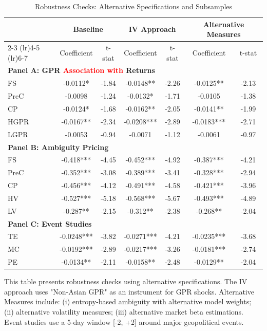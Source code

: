 \documentclass[preprint,12pt,authoryear]{elsarticle}
\begin{document}
\begin{table}[htbp]
\centering
\caption{Robustness Checks: Alternative Specifications and Subsamples}
\label{tab:robustness}
\begin{threeparttable}
\begin{tabular*}{\textwidth}{@{\extracolsep{\fill}} lcccccc @{\extracolsep{\fill}}}
\toprule
& \multicolumn{2}{c}{Baseline} & \multicolumn{2}{c}{IV Approach} & \multicolumn{2}{c}{Alternative Measures} \\
\cmidrule(lr){2-3} \cmidrule(lr){4-5} \cmidrule(lr){6-7}
& Coefficient & t-stat & Coefficient & t-stat & Coefficient & t-stat \\
\midrule
\midrule
\multicolumn{7}{l}{\textbf{Panel A: GPR \textcolor{red}{Association with} Returns}} \\
FS & -0.0112* & -1.84 & -0.0148** & -2.26 & -0.0125** & -2.13 \\
PreC & -0.0098 & -1.24 & -0.0132* & -1.71 & -0.0105 & -1.38 \\
CP & -0.0124* & -1.68 & -0.0162** & -2.05 & -0.0141** & -1.99 \\
HGPR & -0.0167** & -2.34 & -0.0208*** & -2.89 & -0.0183*** & -2.71 \\
LGPR & -0.0053 & -0.94 & -0.0071 & -1.12 & -0.0061 & -0.97 \\
\midrule
\multicolumn{7}{l}{\textbf{Panel B: Ambiguity Pricing}} \\
FS & -0.418*** & -4.45 & -0.452*** & -4.92 & -0.387*** & -4.21 \\
PreC & -0.352*** & -3.08 & -0.389*** & -3.41 & -0.328*** & -2.94 \\
CP & -0.456*** & -4.12 & -0.491*** & -4.58 & -0.421*** & -3.96 \\
HV & -0.527*** & -5.18 & -0.568*** & -5.67 & -0.493*** & -4.89 \\
LV & -0.287** & -2.15 & -0.312** & -2.38 & -0.268** & -2.04 \\
\midrule
\multicolumn{7}{l}{\textbf{Panel C: Event Studies}} \\
TE & -0.0248*** & -3.82 & -0.0271*** & -4.21 & -0.0235*** & -3.68 \\
MC & -0.0192*** & -2.89 & -0.0217*** & -3.26 & -0.0181*** & -2.74 \\
PE & -0.0134** & -2.11 & -0.0158** & -2.48 & -0.0129** & -2.04 \\
\bottomrule
\end{tabular*}
\begin{tablenotes}[flushleft]
\small
\item[] This table presents robustness checks using alternative specifications. The IV approach uses "Non-Asian GPR" as an instrument for GPR shocks. Alternative Measures include: (i) entropy-based ambiguity with alternative model weights; (ii) alternative volatility measures; (iii) alternative market beta estimations. Event studies use a 5-day window [-2, +2] around major geopolitical events.

\end{tablenotes}
\end{threeparttable}
\end{table}
\end{document}
